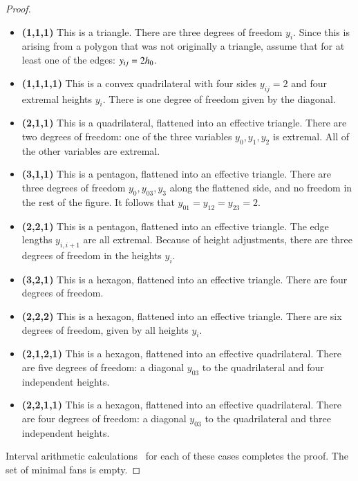 \begin{proof}
\begin{itemize}
\item {\bf (1,1,1)}  This is a triangle.  There are three degrees of
freedom $y_i$.  Since this is arising from a polygon that was not originally a triangle,  assume that for at least one of the edges: $y_{ij}=2{h_0}$.
\item {\bf (1,1,1,1)}  This is a convex quadrilateral with four sides $y_{ij}=2$ and four extremal heights $y_i$.  There is one degree of freedom given by the diagonal.
\item {\bf (2,1,1)} This is a quadrilateral, flattened into an effective triangle.  There are two degrees of freedom: one of the three variables $y_0,y_1,y_2$ is extremal.  All of the other variables are extremal.
\item {\bf (3,1,1)}  This is a pentagon, flattened into an effective triangle.  There are three degrees of freedom $y_0,y_{03},y_3$ along the flattened side, and no freedom in the rest of the figure.  It follows that $y_{01}=y_{12}=y_{23}=2$.
\item {\bf (2,2,1)} This is a pentagon, flattened into an effective triangle.  The edge lengths $y_{i,i+1}$ are all extremal.  Because of height adjustments, there are three degrees of freedom in the heights $y_i$.
\item {\bf (3,2,1)} This is a hexagon, flattened into an effective triangle.  There are four degrees of freedom.
\item {\bf (2,2,2)}  This is a hexagon, flattened into an effective triangle.  There are six degrees of freedom, given by all heights $y_i$.
\item {\bf (2,1,2,1)} This is a hexagon, flattened into an effective quadrilateral.  There are five degrees of freedom: a diagonal $y_{03}$ to the quadrilateral and four independent heights.
\item {\bf (2,2,1,1)}  This is a hexagon, flattened into an effective quadrilateral.  There are four degrees of freedom: a diagonal $y_{03}$ to the quadrilateral and three independent heights.
%
%
%
%
\end{itemize}


Interval arithmetic calculations~\cite[cc:tau]{hales:2009:nonlinear} %
for each of these cases completes the proof.  The set of minimal fans is empty. 
\end{proof}
